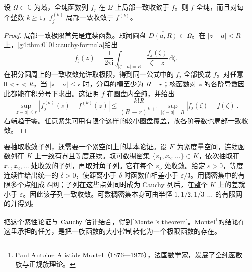 \begin{proposition}\label{g4:prop:0104:holomorphic-limit}
	设 \(\Omega\subset\mathbb C\) 为域，全纯函数列 \(f_j\) 在 \(\Omega\) 上局部一致收敛于 \(f\)。则 \(f\) 全纯，而且对每个整数 \(k\ge1\)，\(f_j^{(k)}\) 局部一致收敛于 \(f^{(k)}\)。
\end{proposition}
\begin{proof}
	局部一致极限首先是连续函数。取闭圆盘 \(\overline{D(a,R)}\subset\Omega\)。在 \(|z-a|<R\) 上，\cref{g4:thm:0101:cauchy-formula}给出
	\[
		f_j(z)=\frac1{2\pi\mathrm i}\int_{|\zeta-a|=R}
		\frac{f_j(\zeta)}{\zeta-z}\,\mathrm d\zeta.
	\]
	在积分圆周上的一致收敛允许取极限，得到同一公式中的 \(f_j\) 全部换成 \(f\)。对任意 \(0<r<R\)，当 \(|z-a|\le r\) 时，分母的模至少为 \(R-r\)；核函数对 \(z\) 的各阶导数因此都能在积分号下求出。这证明 \(f\) 在圆盘内全纯，并给出
	\[
		\sup_{|z-a|\le r}|f_j^{(k)}(z)-f^{(k)}(z)|
		\le \frac{k!R}{(R-r)^{k+1}}
		\sup_{|\zeta-a|=R}|f_j(\zeta)-f(\zeta)|.
	\]
	右端趋于零。任意紧集可用有限个这样的较小圆盘覆盖，故各阶导数也局部一致收敛。
\end{proof}

要抽取收敛子列，还需要一个紧空间上的基本论证。设 \(K\) 为紧度量空间，连续函数列在 \(K\) 上一致有界且等度连续。取可数稠密集 \(\{x_1,x_2,\ldots\}\subset K\)，依次抽取在 \(x_1,x_2,\ldots\) 处收敛的子列，再取对角子列。它在每个 \(x_\nu\) 处收敛。给定 \(\varepsilon>0\)，等度连续性给出统一的 \(\delta>0\)，使距离小于 \(\delta\) 时函数值相差小于 \(\varepsilon/3\)。用稠密集中的有限多个点组成 \(\delta\)-网；子列在这些点处同时成为 Cauchy 列后，在整个 \(K\) 上的差就小于 \(\varepsilon\)。因此该子列一致收敛。可数稠密集本身可由半径 \(1,1/2,1/3,\ldots\) 的有限网的并得到。

\ProseParagraphBreak

把这个紧性论证与 Cauchy 估计结合，得到[Montel's theorem]。Montel\footnote{Paul Antoine Aristide Montel（1876—1975），法国数学家，发展了全纯函数族与正规族理论。}的结论在这里承担的任务，是把一族函数的大小控制转化为一个极限函数的存在。

